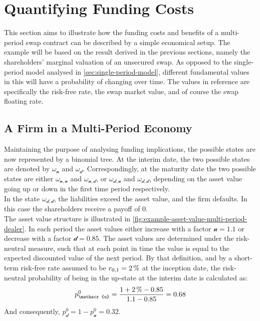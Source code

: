 \documentclass[main.tex]{subfiles}
\begin{document}
    \section{Quantifying Funding Costs}

        This section aims to illustrate
        how the funding costs and benefits of a multi-period swap contract
        can be described by a simple economical setup.
        The example will be based on the result derived in the previous sections,
        namely the shareholders' marginal valuation of an unsecured swap.
        As opposed to the single-period model analysed in \cref{sec:single-period-model},
        different fundamental values in this  will have a probability of changing over time.
        The values in reference are specifically
        the risk-free rate,
        the swap market value,
        and of course the swap floating rate.

    \subsection{A Firm in a Multi-Period Economy}
    \label{sec:swap-examples}
        
        Maintaining the purpose of analysing funding implications,
        the possible states are now represented by a binomial tree.
        At the interim date, the two possible states are denoted by $\omega_\mathscr{u}$ and $\omega_\mathscr{d}$.
        Correspondingly, at the maturity date the two possible states are either
        $\omega_{\mathscr{u},\mathscr{u}}$ and $\omega_{\mathscr{u},\mathscr{d}}$,
        or $\omega_{\mathscr{d},\mathscr{u}}$ and $\omega_{\mathscr{d},\mathscr{d}}$,
        depending on the asset value going up or down in the first time period respectively.
        \\
        In the state $\omega_{\mathscr{d},\mathscr{d}}$, the liabilities exceed the asset value,
        and the firm defaults.
        In this case the shareholders receive a payoff of 0.
        \\
        The asset value structure is illustrated in 
        \cref{fig:example-asset-value-multi-period-dealer}.
        In each period the asset values either increase with a factor $\mathscr{u} = \num{1.1}$
        or decrease with a factor $\mathscr{d} = \num{0.85}$.
        The asset values are determined under the risk-neutral measure,
        such that at each point in time the value is equal to the expected discounted value of the next period.
        By that definition, and by a short-term risk-free rate assumed to be $r_{0,1}=\pct{0.02}$ at the inception date,
        the risk-neutral probability of being in the up-state at the interim date is calculated as:
        \begin{equation*}
            p_{\mathscr{u}}^{0} =
            \frac{
                \num{1} + \pct{0.02} - \num{0.85}
            }{
                \num{1.1} - \num{0.85}
            }
            = \num{0.68}
        \end{equation*}
        And consequently, $p_{\mathscr{d}}^{0} = 1 - p_{\mathscr{u}}^{0} = \num{0.32}$.
\end{document}
